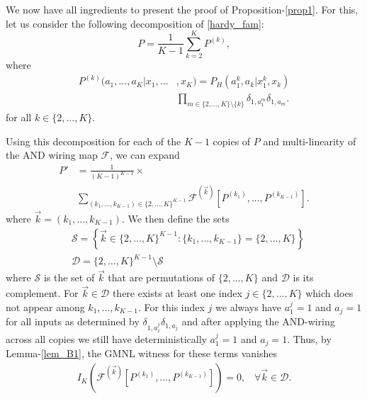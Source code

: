 \documentclass[pra,aps,reprint,superscriptaddress]{revtex4-2}
\theoremstyle{theorem}
\begin{document}
We now have all ingredients to present the proof of Proposition-\ref{prop1}. For this, let us consider the following decomposition of \eqref{hardy_fam}:
\begin{equation}
    P=\frac{1}{K-1}\sum_{k=2}^{K}P^{(k)},
\end{equation}
where
\begin{align}\nonumber
P^{(k)}(a_1,\ldots,a_K|x_1,\ldots&,x_K)=P_H(a_1^k,a_k|x_1^k,x_k)\\
&\prod_{m\in\{2,\ldots,K\}\setminus\{k\}}\delta_{1,a_1^{m}}\delta_{1,a_m}.
\end{align}
for all $k\in\{2,\ldots,K\}$.



Using this decomposition for each of the $K-1$ copies of $P$ and multi-linearity of the AND wiring map $\mathcal{F}$, we can expand
\begin{align}\nonumber
P'&=\frac{1}{(K-1)^{K-1}}\times \\&\sum_{(k_1,...,k_{K-1})\in \{2,...,K\}^{K-1}}\mathcal{F}^{\left(\Vec{k}\right)}\!\left[P^{(k_1)},...,P^{(k_{K-1})}\right].\label{wired_dist_appendA}
\end{align}
where $\Vec{k} = (k_1,...,k_{K-1})$. We then define the sets
\begin{align}\nonumber
    &\mathcal{S} = \left\{\Vec{k}\in\{2,...,K\}^{K-1}:\{k_1,...,k_{K-1}\} = \{2,...,K\}\right\}\\&
    \mathcal{D} = \{2,...,K\}^{K-1}\setminus\mathcal{S}\nonumber
\end{align}
where $\mathcal{S}$ is the set of $\Vec{k}$ that are permutations of $\{2,...,K\}$ and $\mathcal{D}$ is its complement. For $\Vec{k}\in\mathcal{D}$ there exists at least one index $j\in\{2,...,K\}$ which does not appear among $k_1,...,k_{K-1}$. For this index $j$ we always have $a_1^j=1$ and $a_j=1$ for all inputs as determined by $\delta_{1,a_{1}^{j}} \delta_{1,a_j}$ and after applying the AND-wiring across all copies we still have deterministically $a_1^j=1$ and $a_j=1$. Thus,  by Lemma-\ref{lem_B1}, the GMNL witness for these terms vanishes
\begin{align}\label{IkD}
    I_K\left(\mathcal{F}^{(\Vec{k})}\left[P^{(k_1)},...,P^{(k_{K-1})}\right]\right) = 0,\;\;\;\forall \Vec{k}\in\mathcal{D}.
\end{align}
\end{document}

